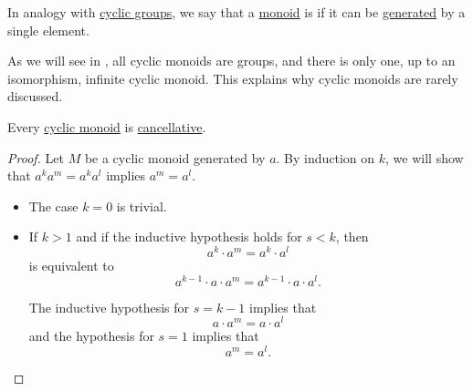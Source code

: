 \begin{definition}\label{def:cyclic_monoid}
  In analogy with \hyperref[def:cyclic_group]{cyclic groups}, we say that a \hyperref[def:monoid]{monoid} is  if it can be \hyperref[def:group_presentation]{generated} by a single element.
\end{definition}
\begin{comments}
  \item As we will see in , all cyclic monoids are groups, and there is only one, up to an isomorphism, infinite cyclic monoid. This explains why cyclic monoids are rarely discussed.
\end{comments}

\begin{lemma}\label{thm:cyclic_monoid_cancellative}
  Every \hyperref[def:cyclic_monoid]{cyclic monoid} is \hyperref[def:binary_operation/cancellative]{cancellative}.
\end{lemma}
\begin{proof}
  Let \( M \) be a cyclic monoid generated by \( a \). By induction on \( k \), we will show that \( a^k a^m = a^k a^l \) implies \( a^m = a^l \).
  \begin{itemize}
    \item The case \( k = 0 \) is trivial.
    \item If \( k > 1 \) and if the inductive hypothesis holds for \( s < k \), then
    \begin{equation*}
      a^k \cdot a^m = a^k \cdot a^l
    \end{equation*}
    is equivalent to
    \begin{equation*}
      a^{k - 1} \cdot a \cdot a^m = a^{k - 1} \cdot a \cdot a^l.
    \end{equation*}

    The inductive hypothesis for \( s = k - 1 \) implies that
    \begin{equation*}
      a \cdot a^m = a \cdot a^l
    \end{equation*}
    and the hypothesis for \( s = 1 \) implies that
    \begin{equation*}
      a^m = a^l.
    \end{equation*}
  \end{itemize}
\end{proof}

